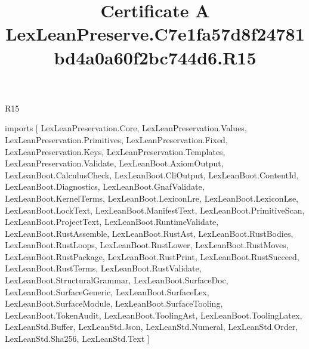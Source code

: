 \begin{lexlean}{R15}
\title{Certificate A LexLeanPreserve.C7e1fa57d8f24781bd4a0a60f2bc744d6.R15}
\begin{coremodule}
imports [
  LexLeanPreservation.Core,
  LexLeanPreservation.Values,
  LexLeanPreservation.Primitives,
  LexLeanPreservation.Fixed,
  LexLeanPreservation.Keys,
  LexLeanPreservation.Templates,
  LexLeanPreservation.Validate,
  LexLeanBoot.AxiomOutput,
  LexLeanBoot.CalculusCheck,
  LexLeanBoot.CliOutput,
  LexLeanBoot.ContentId,
  LexLeanBoot.Diagnostics,
  LexLeanBoot.GnafValidate,
  LexLeanBoot.KernelTerms,
  LexLeanBoot.LexiconLre,
  LexLeanBoot.LexiconLse,
  LexLeanBoot.LockText,
  LexLeanBoot.ManifestText,
  LexLeanBoot.PrimitiveScan,
  LexLeanBoot.ProjectText,
  LexLeanBoot.RuntimeValidate,
  LexLeanBoot.RustAssemble,
  LexLeanBoot.RustAst,
  LexLeanBoot.RustBodies,
  LexLeanBoot.RustLoops,
  LexLeanBoot.RustLower,
  LexLeanBoot.RustMoves,
  LexLeanBoot.RustPackage,
  LexLeanBoot.RustPrint,
  LexLeanBoot.RustSucceed,
  LexLeanBoot.RustTerms,
  LexLeanBoot.RustValidate,
  LexLeanBoot.StructuralGrammar,
  LexLeanBoot.SurfaceDoc,
  LexLeanBoot.SurfaceGeneric,
  LexLeanBoot.SurfaceLex,
  LexLeanBoot.SurfaceModule,
  LexLeanBoot.SurfaceTooling,
  LexLeanBoot.TokenAudit,
  LexLeanBoot.ToolingAst,
  LexLeanBoot.ToolingLatex,
  LexLeanStd.Buffer,
  LexLeanStd.Json,
  LexLeanStd.Numeral,
  LexLeanStd.Order,
  LexLeanStd.Sha256,
  LexLeanStd.Text
]


\end{coremodule}
\end{lexlean}
